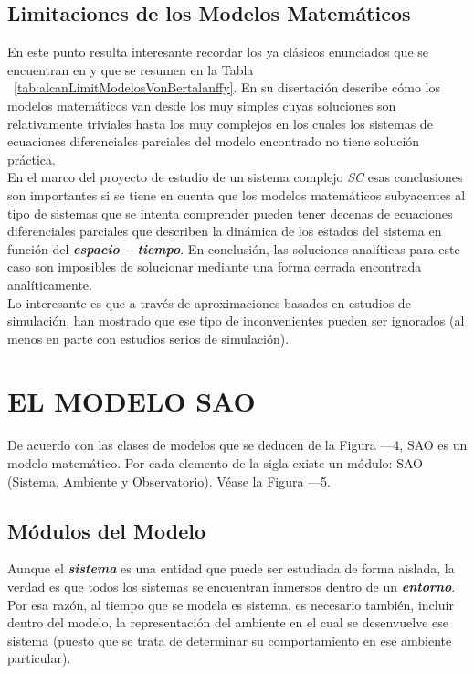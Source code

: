\subsection{Limitaciones de los Modelos Matemáticos}\label{subsec:LimitdeModMat}
En este punto resulta interesante recordar los ya clásicos enunciados que se encuentran en \cite{bertalanffy1968systemTheory} y que se resumen en la Tabla ~\ref{tab:alcanLimitModelosVonBertalanffy}. En su disertación describe cómo los modelos matemáticos van desde los muy simples cuyas soluciones son relativamente triviales hasta los muy complejos en los cuales los sistemas de ecuaciones diferenciales parciales del modelo encontrado no tiene solución práctica.\\

En el marco del proyecto de estudio de un sistema complejo \textit{SC} esas conclusiones son importantes si se tiene en cuenta que los modelos matemáticos subyacentes al tipo de sistemas que se intenta comprender pueden tener decenas de ecuaciones diferenciales parciales que describen la dinámica de los estados del sistema en función del \textit{\textbf{espacio -- tiempo}}. En conclusión, las soluciones analíticas para este caso son imposibles de solucionar mediante una forma cerrada encontrada analíticamente.\\

Lo interesante es que a través de aproximaciones basados en estudios de simulación, \cite{law1991simulationModeling} han mostrado que ese tipo de inconvenientes pueden ser ignorados (al menos en parte con estudios serios de simulación).\\

\section{EL MODELO SAO}\label{sec:SAOModel}
De acuerdo con las clases de modelos que se deducen de la Figura —4, SAO es un modelo matemático. Por cada elemento de la sigla existe un módulo: SAO (Sistema, Ambiente y Observatorio). Véase la Figura —5.\\

\subsection{Módulos del Modelo}\label{subsec:ModulosdelModelo}
Aunque el \textit{\textbf{sistema}} es una entidad que puede ser estudiada de forma aislada, la verdad es que todos los sistemas se encuentran inmersos dentro de un \textit{\textbf{entorno}}. Por esa razón, al tiempo que se modela es sistema, es necesario también, incluir dentro del modelo, la representación del ambiente en el cual se desenvuelve ese sistema (puesto que se trata de determinar su comportamiento en ese ambiente particular).\\

